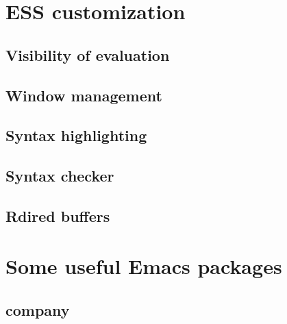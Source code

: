 \documentclass[presentation]{beamer}
\begin{document}
\section{ESS customization}
\label{sec:org7db8a9d}
\subsection{Visibility of evaluation}
\label{sec:orgcb4de4d}
\subsection{Window management}
\label{sec:org886da15}
\subsection{Syntax highlighting}
\label{sec:org78643aa}
\subsection{Syntax checker}
\label{sec:org827bd3d}
\subsection{Rdired buffers}
\label{sec:orgdef6442}

\section{Some useful Emacs packages}
\label{sec:org482d0a3}
\subsection{company}
\label{sec:org019f383}
\end{document}
